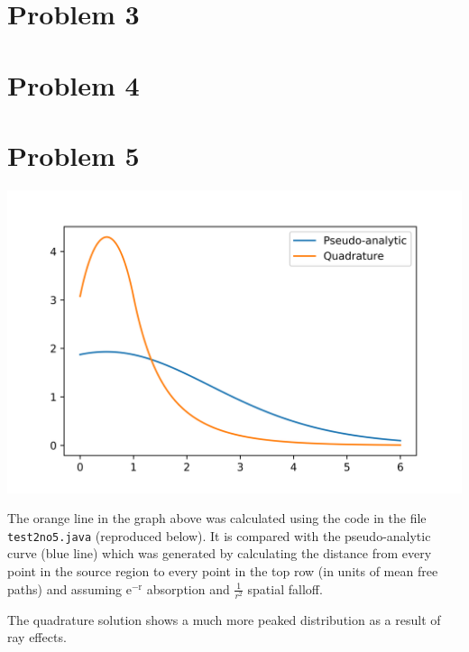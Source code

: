 \documentclass{article}
\begin{document}
\section{Problem 3}


\section{Problem 4}

\pagebreak
\section{Problem 5}

\includegraphics[width=\textwidth]{no5result}

The orange line in the graph above was calculated using the code in the file \texttt{test2no5.java} (reproduced below). It 
is compared with the pseudo-analytic curve (blue line) which was generated by calculating the 
distance from every point in the source region to every point in the top row (in units of mean free 
paths) and assuming $\mathrm{e^{-r}}$ absorption and $\frac{1}{r^2}$ spatial falloff.

The quadrature solution shows a much more peaked distribution as a result of ray effects.


\end{document}
